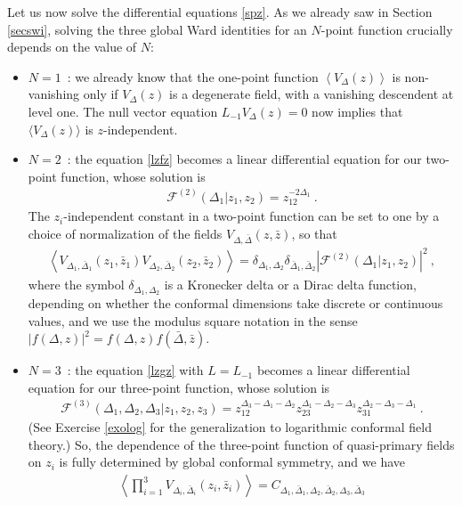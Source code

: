 \documentclass[12pt,a4paper,notitlepage]{report}
\numberwithin{equation}{section}
\theoremstyle{break}
\begin{document}
Let us now solve the differential equations \eqref{spz}.
As we already saw in Section \ref{secswi}, solving the three global Ward identities for an $N$-point function crucially depends on the value of $N$:
\begin{itemize}
 \item $\boxed{N=1}$\ : we already know that the one-point function $\left\langle V_\Delta(z)\right\rangle$ is non-vanishing only if $V_\Delta(z)$ is a degenerate field, with a vanishing descendent at level one.
The null vector equation $L_{-1}V_\Delta(z)=0$ now implies that $\langle V_\Delta(z)\rangle$ is $z$-independent.
\item $\boxed{N=2}$\ : the equation \eqref{lzfz} becomes a linear differential equation for our two-point function, whose solution is 
\begin{align}
 \boxed{\mathcal{F}^{(2)}(\Delta_1|z_1,z_2) = z_{12}^{-2\Delta_1}}\ .
\label{fzz}
\end{align}
The $z_i$-independent constant in a two-point function can be set to one by a choice of normalization of the fields $V_{\Delta,\bar{\Delta}}(z,\bar{z})$, so that 
\begin{align}
 \left\langle V_{\Delta_1,\bar{\Delta}_1}(z_1,\bar{z}_1) V_{\Delta_2,\bar{\Delta}_2}(z_2,\bar{z}_2)\right\rangle = \delta_{\Delta_1,\Delta_2}\delta_{\bar{\Delta}_1,\bar{\Delta}_2} \left|\mathcal{F}^{(2)}(\Delta_1|z_1,z_2)\right|^2\ ,
\end{align}
where the symbol $\delta_{\Delta_1,\Delta_2}$ is a Kronecker delta or a Dirac delta function, depending on whether the conformal dimensions take discrete or continuous values, and we use the modulus square notation in the sense $|f(\Delta,z)|^2 = f(\Delta,z)f(\bar{\Delta},\bar{z})$.
\item $\boxed{N=3}$\ : the equation \eqref{lzgz} with $L=L_{-1}$ becomes a linear differential equation for our three-point function, whose solution is 
\begin{align}
 \boxed{\mathcal{F}^{(3)}(\Delta_1,\Delta_2,\Delta_3|z_1,z_2,z_3) = z_{12}^{\Delta_3-\Delta_1-\Delta_2} z_{23}^{\Delta_1-\Delta_2-\Delta_3} z_{31}^{\Delta_2-\Delta_3-\Delta_1}}\ .
\label{fzzz}
\end{align}
(See Exercise \ref{exolog} for the generalization to logarithmic conformal field theory.) 
So, the dependence of the three-point function of quasi-primary fields on $z_i$ is fully determined by global conformal symmetry, and we have 
\begin{align}
 \left\langle \prod_{i=1}^3 V_{\Delta_i,\bar{\Delta}_i}(z_i,\bar{z}_i) \right\rangle = C_{\Delta_1,\bar{\Delta}_1,\Delta_2,\bar{\Delta}_2,\Delta_3,\bar{\Delta}_3}

\end{align}
\end{itemize}
\end{document}

